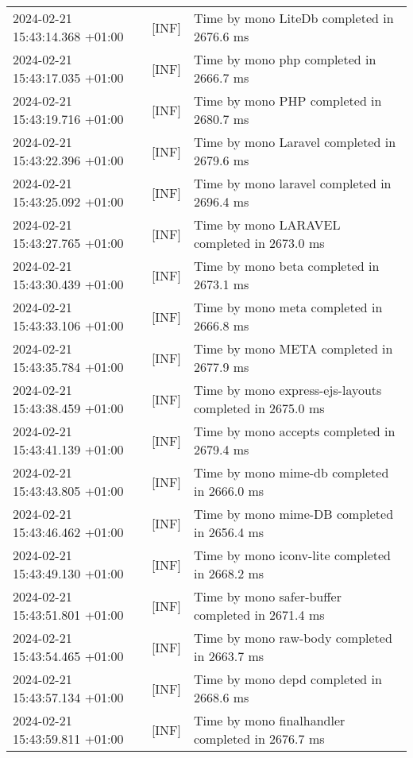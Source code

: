 {{\begin{tabularx}{\textwidth}{|l|l|X|}
                    2024-02-21 15:43:14.368 +01:00 & [INF] & Time by mono LiteDb completed in 2676.6 ms \\
                    2024-02-21 15:43:17.035 +01:00 & [INF] & Time by mono php completed in 2666.7 ms \\
                    2024-02-21 15:43:19.716 +01:00 & [INF] & Time by mono PHP completed in 2680.7 ms \\
                    2024-02-21 15:43:22.396 +01:00 & [INF] & Time by mono Laravel completed in 2679.6 ms \\
                    2024-02-21 15:43:25.092 +01:00 & [INF] & Time by mono laravel completed in 2696.4 ms \\
                    2024-02-21 15:43:27.765 +01:00 & [INF] & Time by mono LARAVEL completed in 2673.0 ms \\
                    2024-02-21 15:43:30.439 +01:00 & [INF] & Time by mono beta completed in 2673.1 ms \\
                    2024-02-21 15:43:33.106 +01:00 & [INF] & Time by mono meta completed in 2666.8 ms \\
                    2024-02-21 15:43:35.784 +01:00 & [INF] & Time by mono META completed in 2677.9 ms \\
                    2024-02-21 15:43:38.459 +01:00 & [INF] & Time by mono express-ejs-layouts completed in 2675.0 ms \\
                    2024-02-21 15:43:41.139 +01:00 & [INF] & Time by mono accepts completed in 2679.4 ms \\
                    2024-02-21 15:43:43.805 +01:00 & [INF] & Time by mono mime-db completed in 2666.0 ms \\
                    2024-02-21 15:43:46.462 +01:00 & [INF] & Time by mono mime-DB completed in 2656.4 ms \\
                    2024-02-21 15:43:49.130 +01:00 & [INF] & Time by mono iconv-lite completed in 2668.2 ms \\
                    2024-02-21 15:43:51.801 +01:00 & [INF] & Time by mono safer-buffer completed in 2671.4 ms \\
                    2024-02-21 15:43:54.465 +01:00 & [INF] & Time by mono raw-body completed in 2663.7 ms \\
                    2024-02-21 15:43:57.134 +01:00 & [INF] & Time by mono depd completed in 2668.6 ms \\
                    2024-02-21 15:43:59.811 +01:00 & [INF] & Time by mono finalhandler completed in 2676.7 ms \\

\end{tabularx}}}
